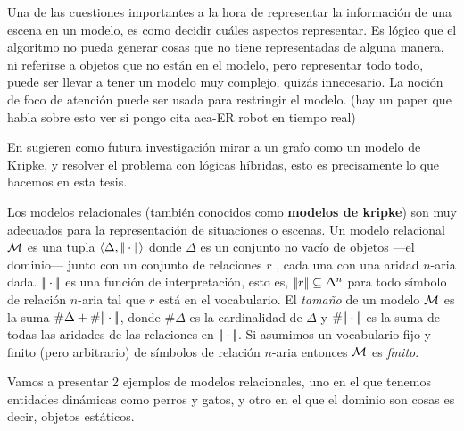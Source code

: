 Una de las cuestiones importantes a la hora de representar la informaci\'on de una escena en un modelo, es como decidir cu\'ales aspectos representar.
Es l\'ogico que el algoritmo no pueda generar cosas que no tiene representadas de alguna manera, ni referirse a objetos que no est\'an en el modelo, pero representar todo todo, puede ser llevar a tener un modelo muy complejo, quiz\'as innecesario. La noci\'on de foco de atenci\'on puede ser usada para restringir el modelo. (hay un paper que habla sobre esto ver si pongo cita aca-ER robot en tiempo real)

En \cite{survey} sugieren como futura investigaci\'on mirar a un grafo como un modelo de Kripke, y resolver el problema con l\'ogicas h\'ibridas, esto es precisamente lo que hacemos en esta tesis. 

Los modelos relacionales (tambi\'en conocidos como \textbf{modelos de kripke}) son muy adecuados para la representaci\'on de situaciones o escenas. Un modelo relacional $\mathcal{M}$ es una tupla $\langle \Delta,|\!|\cdot|\!| \rangle$ donde $\Delta$ es un conjunto no vac\'io de objetos ---el dominio--- junto con un conjunto de relaciones $r$ , cada una con una aridad $n$-aria dada. $|\!|\cdot|\!|$ es una funci\'on de interpretaci\'on, esto es,
$|\!|r|\!| \subseteq \Delta^n$ para todo s\'imbolo de relaci\'on $n$-aria tal que
$r$ est\'a en el vocabulario.  El \emph{tama\~no} de un modelo $\mathcal{M}$ es la suma
$\#\Delta + \#|\!|\cdot|\!|$, donde $\#\Delta$ es la cardinalidad
de $\Delta$ y $\#|\!|\cdot|\!|$ es la suma de todas las aridades de las
relaciones en $|\!|\cdot|\!|$.
Si asumimos un vocabulario fijo y finito (pero arbitrario) de
s\'imbolos de relaci\'on $n$-aria entonces $\mathcal{M}$ es \emph{finito}. 



Vamos a presentar 2 ejemplos de modelos relacionales, uno en el que tenemos entidades din\'amicas como perros y gatos, y otro en el que el dominio son cosas es decir, objetos est\'aticos.


